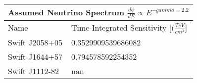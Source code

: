 \documentclass[]{article}
\begin{document}
\begin{tabular}{ |p{3.5cm}||p{4.5cm}|} 
\hline 
\multicolumn{2}{|c|}{Assumed Neutrino Spectrum $ \frac {d \phi}{dE} \propto E ^ {-gamma=2.2} $} \\ 
\hline 
Name&Time-Integrated Sensitivity [$ (\frac{TeV}{cm^{2}} $] \\ 
\hline 
Swift J2058+05 & \num[round-precision=2, round-mode=figures, scientific-notation=true]{0.3529909539686082}  \\ 
Swift J1644+57 & \num[round-precision=2, round-mode=figures, scientific-notation=true]{0.794578592254352}  \\ 
Swift J1112-82 & \num[round-precision=2, round-mode=figures, scientific-notation=true]{nan}  \\ 
\hline 
\end{tabular} 
\end{document}
